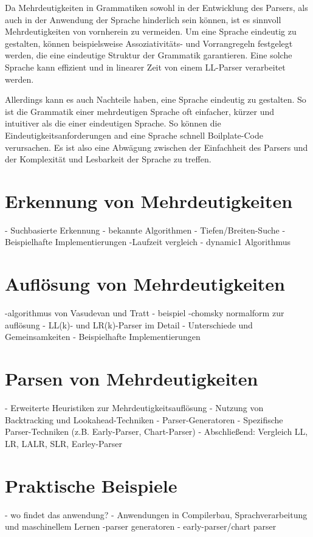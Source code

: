 \documentclass[runningheads]{llncs}
\begin{document}
Da Mehrdeutigkeiten in Grammatiken sowohl in der Entwicklung des Parsers,
als auch in der Anwendung der Sprache hinderlich sein können,
ist es sinnvoll Mehrdeutigkeiten von vornherein zu vermeiden.
Um eine Sprache eindeutig zu gestalten,
können beispielsweise Assoziativitäts- und Vorrangregeln festgelegt werden,
die eine eindeutige Struktur der Grammatik garantieren.
Eine solche Sprache kann effizient und in linearer Zeit von einem LL-Parser verarbeitet werden.

Allerdings kann es auch Nachteile haben, eine Sprache eindeutig zu gestalten.
So ist die Grammatik einer mehrdeutigen Sprache oft einfacher, kürzer und intuitiver als die einer eindeutigen Sprache.
So können die Eindeutigkeitsanforderungen and eine Sprache schnell Boilplate-Code verursachen.
Es ist also eine Abwägung zwischen der Einfachheit des Parsers und der Komplexität und Lesbarkeit der Sprache zu treffen.


\section{Erkennung von Mehrdeutigkeiten}
- Suchbasierte Erkennung
- bekannte Algorithmen
- Tiefen/Breiten-Suche
- Beispielhafte Implementierungen
-Laufzeit vergleich
- dynamic1 Algorithmus

\section{Auflösung von Mehrdeutigkeiten}
-algorithmus von Vasudevan und Tratt
- beispiel
-chomsky normalform zur auflösung
- LL(k)- und LR(k)-Parser im Detail
- Unterschiede und Gemeinsamkeiten
- Beispielhafte Implementierungen

\section{Parsen von Mehrdeutigkeiten}
- Erweiterte Heuristiken zur Mehrdeutigkeitsauflösung
- Nutzung von Backtracking und Lookahead-Techniken
- Parser-Generatoren
- Spezifische Parser-Techniken (z.B. Early-Parser, Chart-Parser)
- Abschließend: Vergleich LL, LR, LALR, SLR, Earley-Parser

\section{Praktische Beispiele}
- wo findet das anwendung?
- Anwendungen in Compilerbau, Sprachverarbeitung und maschinellem Lernen
-parser generatoren
- early-parser/chart parser
\end{document}
